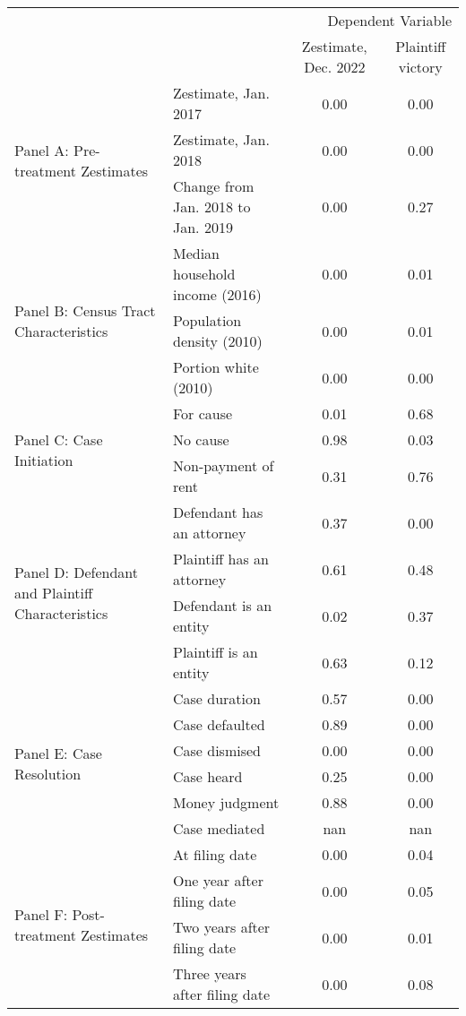 \begin{tabular}{llcc}
\toprule
 &  & \multicolumn{2}{r}{Dependent Variable} \\
 &  & Zestimate, Dec. 2022 & Plaintiff victory \\
\midrule
\multirow[c]{3}{3cm}{Panel A: Pre-treatment Zestimates} & Zestimate, Jan. 2017 & 0.00 & 0.00 \\
 & Zestimate, Jan. 2018 & 0.00 & 0.00 \\
 & Change from Jan. 2018 to Jan. 2019 & 0.00 & 0.27 \\
\multirow[c]{3}{3cm}{Panel B: Census Tract Characteristics} & Median household income (2016) & 0.00 & 0.01 \\
 & Population density (2010) & 0.00 & 0.01 \\
 & Portion white (2010) & 0.00 & 0.00 \\
\multirow[c]{3}{3cm}{Panel C: Case Initiation} & For cause & 0.01 & 0.68 \\
 & No cause & 0.98 & 0.03 \\
 & Non-payment of rent & 0.31 & 0.76 \\
\multirow[c]{4}{3cm}{Panel D: Defendant and Plaintiff Characteristics} & Defendant has an attorney & 0.37 & 0.00 \\
 & Plaintiff has an attorney & 0.61 & 0.48 \\
 & Defendant is an entity & 0.02 & 0.37 \\
 & Plaintiff is an entity & 0.63 & 0.12 \\
\multirow[c]{6}{3cm}{Panel E: Case Resolution} & Case duration & 0.57 & 0.00 \\
 & Case defaulted & 0.89 & 0.00 \\
 & Case dismised & 0.00 & 0.00 \\
 & Case heard & 0.25 & 0.00 \\
 & Money judgment & 0.88 & 0.00 \\
 & Case mediated & nan & nan \\
\multirow[c]{4}{3cm}{Panel F: Post-treatment Zestimates} & At filing date & 0.00 & 0.04 \\
 & One year after filing date & 0.00 & 0.05 \\
 & Two years after filing date & 0.00 & 0.01 \\
 & Three years after filing date & 0.00 & 0.08 \\
\bottomrule
\end{tabular}
